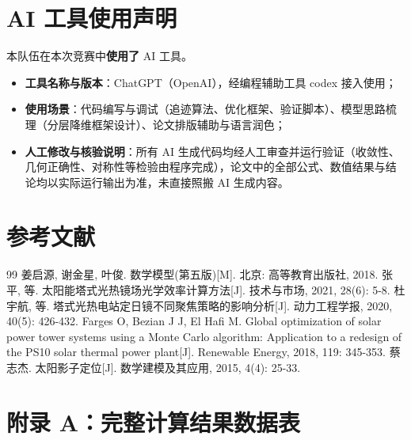 \documentclass[12pt,a4paper,fontset=fandol]{ctexart}
\begin{document}
\section*{AI 工具使用声明}

本队伍在本次竞赛中\textbf{使用了} AI 工具。

\begin{itemize}
    \item \textbf{工具名称与版本}：ChatGPT（OpenAI），经编程辅助工具 codex 接入使用；
    \item \textbf{使用场景}：代码编写与调试（追迹算法、优化框架、验证脚本）、模型思路梳理（分层降维框架设计）、论文排版辅助与语言润色；
    \item \textbf{人工修改与核验说明}：所有 AI 生成代码均经人工审查并运行验证（收敛性、几何正确性、对称性等检验由程序完成），论文中的全部公式、数值结果与结论均以实际运行输出为准，未直接照搬 AI 生成内容。
\end{itemize}

\newpage

\section{参考文献}
\begin{thebibliography}{99}
     姜启源, 谢金星, 叶俊. 数学模型(第五版)[M]. 北京: 高等教育出版社, 2018.
     张平, 等. 太阳能塔式光热镜场光学效率计算方法[J]. 技术与市场, 2021, 28(6): 5-8.
     杜宇航, 等. 塔式光热电站定日镜不同聚焦策略的影响分析[J]. 动力工程学报, 2020, 40(5): 426-432.
     Farges O, Bezian J J, El Hafi M. Global optimization of solar power tower systems using a Monte Carlo algorithm: Application to a redesign of the PS10 solar thermal power plant[J]. Renewable Energy, 2018, 119: 345-353.
     蔡志杰. 太阳影子定位[J]. 数学建模及其应用, 2015, 4(4): 25-33.
\end{thebibliography}

\appendix

\section*{附录 A：完整计算结果数据表}
\end{document}
